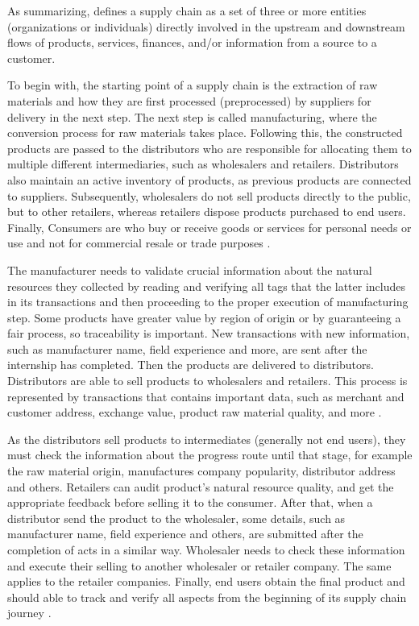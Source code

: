 As summarizing, \cite{mentzer2001defining} defines a supply chain as a set of three or more entities (organizations or individuals) directly involved in the upstream and downstream flows of products, services, finances, and/or information from a source to a customer. 


To begin with, the starting point of a supply chain is the extraction of raw materials and how they are first processed (preprocessed) by suppliers for delivery in the next step. The next step is called manufacturing, where the conversion process for raw materials takes place. Following this, the constructed products are passed to the distributors who are responsible for allocating them to multiple different intermediaries, such as wholesalers and retailers. Distributors also maintain an active inventory of products, as previous products are connected to suppliers. Subsequently, wholesalers do not sell products directly to the public, but to other retailers, whereas retailers dispose products purchased to end users. Finally, Consumers are who buy or receive goods or services for personal needs or use and not for commercial resale or trade purposes \cite{litke2019blockchains}.

The manufacturer needs to validate crucial information about the natural resources they collected by reading and verifying all tags that the latter includes in its transactions and then proceeding to the proper execution of manufacturing step. Some products have greater value by region of origin or by guaranteeing a fair process, so traceability is important. New transactions with new information, such as manufacturer name, field experience and more, are sent after the internship has completed. Then the products are delivered to distributors. Distributors are able to sell products to wholesalers and retailers. This process is represented by transactions that contains important data, such as merchant and customer address, exchange value, product raw material quality, and more \cite{sauer2018extending}. 

As the distributors sell products to intermediates (generally not end users), they must check the information about the progress route until that stage, for example the raw material origin, manufactures company popularity, distributor address and others. Retailers can audit product's natural resource quality, and get the appropriate feedback before selling it to the consumer. After that, when a distributor send the product to the wholesaler, some details, such as manufacturer name, field experience and others, are submitted after the completion of acts in a similar way. Wholesaler needs to check these information and execute their selling to another wholesaler or retailer company. The same applies to the retailer companies. Finally, end users obtain the final product and should able to track and verify all aspects from the beginning of its supply chain journey \cite{litke2019blockchains}. 

